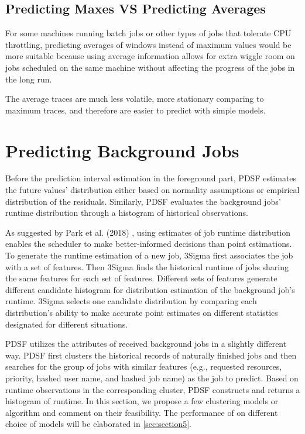 \documentclass[sigplan,10pt,review,anonymous]{acmart}
\begin{document}
\subsection{Predicting Maxes VS Predicting Averages}

For some machines running batch jobs or other types of jobs that tolerate CPU
throttling, predicting averages of windows instead of maximum values would be
more suitable because using average information allows for extra wiggle room on
jobs scheduled on the same machine without affecting the progress of the jobs in
the long run.

The average traces are much less volatile, more stationary comparing to maximum
traces, and therefore are easier to predict with simple models.

\section{Predicting Background Jobs}
\label{sec:section4}

Before the prediction interval estimation in the foreground part, PDSF
estimates the future values' distribution either based on normality assumptions
or empirical distribution of the residuals. Similarly, PDSF evaluates
the background jobs' runtime distribution through a histogram of historical
observations. 

As suggested by Park et al. (2018) \cite{10.1145/3190508.3190515}, using
estimates of job runtime distribution enables the scheduler to make
better-informed decisions than point estimations. To generate the runtime
estimation of a new job, 3Sigma \cite{10.1145/3190508.3190515} first associates
the job with a set of features. Then 3Sigma finds the historical runtime of jobs
sharing the same features for each set of features. Different sets of features
generate different candidate histogram for distribution estimation of the
background job's runtime. 3Sigma selects one candidate distribution by comparing
each distribution's ability to make accurate point estimates on different
statistics designated for different situations.

PDSF utilizes the attributes of received background jobs in a slightly
different way. PDSF first clusters the historical records of naturally
finished jobs and then searches for the group of jobs with similar features
(e.g., requested resources, priority, hashed user name, and hashed job name) as
the job to predict. Based on runtime observations in the corresponding cluster,
PDSF constructs and returns a histogram of runtime. In this section, we
propose a few clustering models or algorithm and comment on their feasibility.
The performance of on different choice of models will be elaborated in
\cref{sec:section5}. 
\end{document}
